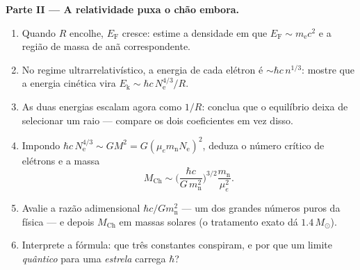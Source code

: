 \begin{problem}
\medskip\noindent\textbf{Parte II --- A relatividade puxa o chão
embora.}
\begin{enumerate}[resume]
  \item Quando $R$ encolhe, $E_{\text{F}}$ cresce: estime a densidade
        em que $E_{\text{F}} \sim m_{\text{e}}c^2$ e a
        região de massa de anã correspondente.
  \item No regime ultrarrelativístico, a energia de cada elétron é
        $\sim\hbar c\,n^{1/3}$: mostre que a energia cinética vira
        $E_{\text{k}} \sim \hbar c\,N_{\text{e}}^{4/3}/R$.
  \item As duas energias escalam agora como $1/R$: conclua que o
        equilíbrio deixa de selecionar um raio --- compare os dois
        coeficientes em vez disso.
  \item Impondo $\hbar c\,N_{\text{e}}^{4/3} \sim
        GM^2 = G(\mu_em_{\text{n}}N_{\text{e}})^2$, deduza o
        número crítico de elétrons e a massa
        \[
        M_{\text{Ch}} \sim
        \Big(\frac{\hbar c}{G\,m_{\text{n}}^2}\Big)^{3/2}
        \frac{m_{\text{n}}}{\mu_e^2} .
        \]
  \item Avalie a razão adimensional $\hbar c/Gm_{\text{n}}^2$
        --- um dos grandes números puros da física --- e depois
        $M_{\text{Ch}}$ em massas solares (o tratamento exato dá
        $1.4\,M_\odot$).
  \item Interprete a fórmula: que três constantes conspiram, e
        por que um limite \emph{quântico} para uma \emph{estrela}
        carrega $\hbar$?
\end{enumerate}


\end{problem}

